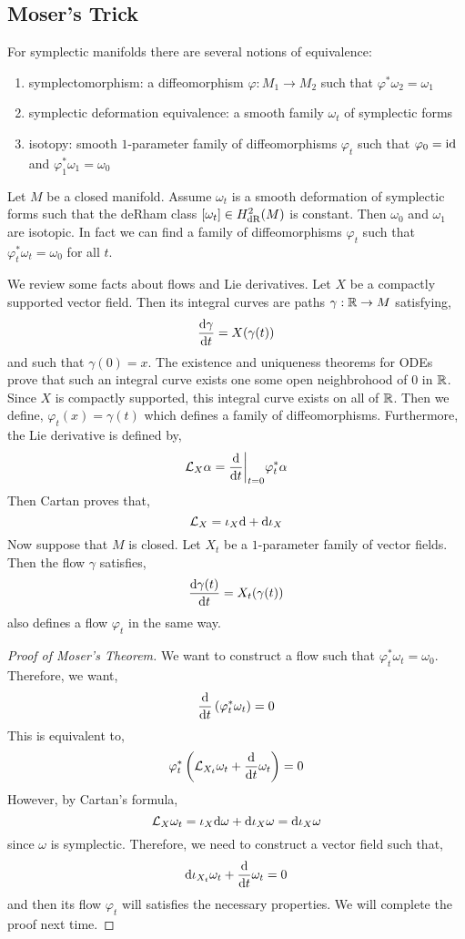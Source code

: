 \documentclass[12pt]{article}
\begin{document}
\subsection{Moser's Trick}

For symplectic manifolds there are several notions of equivalence:
\begin{enumerate}
\item symplectomorphism: a diffeomorphism $\varphi : M_1 \to M_2$ such that $\varphi^* \omega_2 = \omega_1$
\item symplectic deformation equivalence: a smooth family $\omega_t$ of symplectic forms
\item isotopy: smooth $1$-parameter family of diffeomorphisms $\varphi_t$ such that $\varphi_0 = \mathrm{id}$ and $\varphi_1^* \omega_1 = \omega_0$ 
\end{enumerate}

\begin{theorem}[Moser]
Let $M$ be a closed manifold. Assume $\omega_t$ is a smooth deformation of symplectic forms such that the deRham class $[\omega_t] \in H^2_{\mathrm{dR}}(M)$ is constant. Then $\omega_0$ and $\omega_1$ are isotopic. In fact we can find a family of diffeomorphisms $\varphi_t$ such that $\varphi_t^* \omega_t = \omega_0$ for all $t$. 
\end{theorem}

\begin{rmk}
We review some facts about flows and Lie derivatives. Let $X$ be a compactly supported vector field. Then its integral curves are paths $\gamma : \mathbb{R} \to M$ satisfying,
\[ \frac{\mathrm{d}{\gamma}}{\mathrm{d}{t}} = X(\gamma(t)) \]
and such that $\gamma(0) = x$. The existence and uniqueness theorems for ODEs prove that such an integral curve exists one some open neighbrohood of $0$ in $\mathbb{R}$. Since $X$ is compactly supported, this integral curve exists on all of $\mathbb{R}$. Then we define, $\varphi_t(x) = \gamma(t)$ which defines a family of diffeomorphisms. Furthermore, the Lie derivative is defined by,
\[ \mathcal{L}_X \alpha = \frac{\mathrm{d}{}}{\mathrm{d}{t}} \bigg|_{t=0} \varphi^*_t \alpha \]
Then Cartan proves that,
\[ \mathcal{L}_X = \iota_X \mathrm{d} + \mathrm{d} \iota_X \]
Now suppose that $M$ is closed. Let $X_t$ be a $1$-parameter family of vector fields. Then the flow $\gamma$ satisfies,
\[ \frac{\mathrm{d}{\gamma(t)}}{\mathrm{d}{t}} = X_t(\gamma(t)) \]
also defines a flow $\varphi_t$ in the same way. 
\end{rmk}

\begin{proof}[Proof of Moser's Theorem]
We want to construct a flow such that $\varphi_t^* \omega_t = \omega_0$. Therefore, we want,
\[ \frac{\mathrm{d}{}}{\mathrm{d}{t}} \left( \varphi_t^* \omega_t \right) = 0 \]
This is equivalent to,
\[ \varphi_t^* \left( \mathcal{L}_{X_t} \omega_t + \frac{\mathrm{d}{}}{\mathrm{d}{t}} \omega_t \right) = 0 \]
However, by Cartan's formula,
\[ \mathcal{L}_{X} \omega_t = \iota_{X} \mathrm{d}{\omega} + \mathrm{d}{\iota_X \omega} = \mathrm{d}{\iota_X \omega}  \]
since $\omega$ is symplectic. Therefore, we need to construct a vector field such that,
\[ \mathrm{d}{\iota_{X_t} \omega_t} + \frac{\mathrm{d}{}}{\mathrm{d}{t}} \omega_t = 0 \]
and then its flow $\varphi_t$ will satisfies the necessary properties. We will complete the proof next time.
\end{proof}
\end{document}
